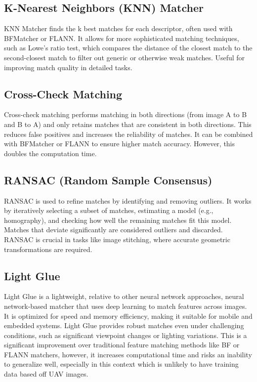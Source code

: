 \subsection*{K-Nearest Neighbors (KNN) Matcher} KNN Matcher finds the k best matches for each descriptor, often used with BFMatcher or FLANN. It allows for more sophisticated matching techniques, such as Lowe’s ratio test, which compares the distance of the closest match to the second-closest match to filter out generic or otherwise weak matches. Useful for improving match quality in detailed tasks.

\subsection*{Cross-Check Matching} Cross-check matching performs matching in both directions (from image A to B and B to A) and only retains matches that are consistent in both directions. This reduces false positives and increases the reliability of matches. It can be combined with BFMatcher or FLANN to ensure higher match accuracy. However, this doubles the computation time.

\subsection*{RANSAC (Random Sample Consensus)} RANSAC is used to refine matches by identifying and removing outliers. It works by iteratively selecting a subset of matches, estimating a model (e.g., homography), and checking how well the remaining matches fit this model. Matches that deviate significantly are considered outliers and discarded. RANSAC is crucial in tasks like image stitching, where accurate geometric transformations are required.

\subsection*{Light Glue} Light Glue is a lightweight, relative to other neural network approaches, neural network-based matcher that uses deep learning to match features across images. It is optimized for speed and memory efficiency, making it suitable for mobile and embedded systems. Light Glue provides robust matches even under challenging conditions, such as significant viewpoint changes or lighting variations. This is a significant improvement over traditional feature matching methods like BF or FLANN matchers, however, it increases computational time and risks an inability to generalize well, especially in this context which is unlikely to have training data based off UAV images.

